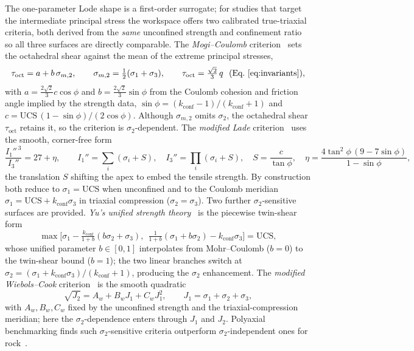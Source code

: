 \documentclass[11pt]{article}
\begin{document}
The one-parameter Lode shape is a first-order surrogate; for studies that target
the intermediate principal stress the workspace offers two calibrated
true-triaxial criteria, both derived from the \emph{same} unconfined strength and
confinement ratio so all three surfaces are directly comparable. The
\emph{Mogi--Coulomb} criterion~\citep{mogi1971,alajmi2005} sets the octahedral
shear against the mean of the extreme principal stresses,
\begin{equation}
\tau_{\mathrm{oct}}=a+b\,\sigma_{m,2},\qquad
\sigma_{m,2}=\tfrac12(\sigma_1+\sigma_3),\qquad
\tau_{\mathrm{oct}}=\tfrac{\sqrt2}{3}\,q\ \ (\text{Eq.~\eqref{eq:invariants}}),
\label{eq:mogi}
\end{equation}
with $a=\tfrac{2\sqrt2}{3}c\cos\phi$ and $b=\tfrac{2\sqrt2}{3}\sin\phi$ from the
Coulomb cohesion and friction angle implied by the strength data,
$\sin\phi=(k_{\mathrm{conf}}-1)/(k_{\mathrm{conf}}+1)$ and
$c=\mathrm{UCS}\,(1-\sin\phi)/(2\cos\phi)$. Although $\sigma_{m,2}$ omits
$\sigma_2$, the octahedral shear $\tau_{\mathrm{oct}}$ retains it, so the criterion
is $\sigma_2$-dependent. The \emph{modified Lade} criterion~\citep{ewy1999} uses
the smooth, corner-free form
\begin{equation}
\frac{I_1''^{\,3}}{I_3''}=27+\eta,\qquad
I_1''=\textstyle\sum_i(\sigma_i+S),\quad I_3''=\textstyle\prod_i(\sigma_i+S),\quad
S=\frac{c}{\tan\phi},\quad
\eta=\frac{4\tan^2\phi\,(9-7\sin\phi)}{1-\sin\phi},
\label{eq:lade}
\end{equation}
the translation $S$ shifting the apex to embed the tensile strength. By
construction both reduce to $\sigma_1=\mathrm{UCS}$ when unconfined and to the
Coulomb meridian $\sigma_1=\mathrm{UCS}+k_{\mathrm{conf}}\sigma_3$ in triaxial
compression ($\sigma_2=\sigma_3$). Two further $\sigma_2$-sensitive surfaces are
provided. \emph{Yu's unified strength theory}~\citep{yu2002} is the piecewise
twin-shear form
\begin{equation}
\max\!\Big[\sigma_1-\tfrac{k_{\mathrm{conf}}}{1+b}(b\sigma_2+\sigma_3),\ \
\tfrac{1}{1+b}(\sigma_1+b\sigma_2)-k_{\mathrm{conf}}\sigma_3\Big]=\mathrm{UCS},
\label{eq:yu}
\end{equation}
whose unified parameter $b\in[0,1]$ interpolates from Mohr--Coulomb ($b=0$) to the
twin-shear bound ($b=1$); the two linear branches switch at
$\sigma_2=(\sigma_1+k_{\mathrm{conf}}\sigma_3)/(k_{\mathrm{conf}}+1)$, producing
the $\sigma_2$ enhancement. The \emph{modified Wiebols--Cook}
criterion~\citep{wiebols1968} is the smooth quadratic
\begin{equation}
\sqrt{J_2}=A_w+B_w J_1+C_w J_1^{2},\qquad J_1=\sigma_1+\sigma_2+\sigma_3,
\label{eq:wc}
\end{equation}
with $A_w,B_w,C_w$ fixed by the unconfined strength and the triaxial-compression
meridian; here the $\sigma_2$-dependence enters through $J_1$ and $J_2$. Polyaxial
benchmarking finds such $\sigma_2$-sensitive criteria outperform
$\sigma_2$-independent ones for rock~\citep{colmenares2002}.
\end{document}
